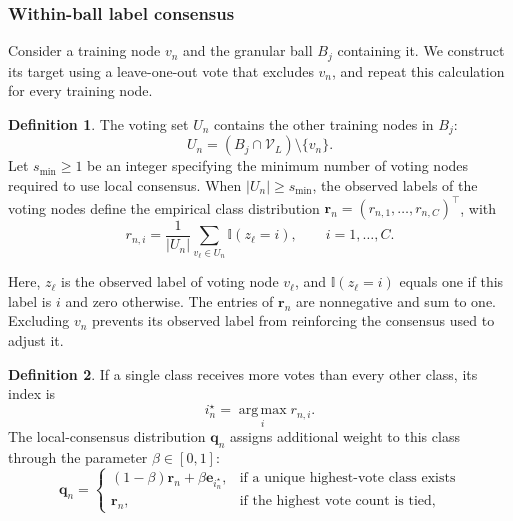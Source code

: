 \documentclass[times,review,10pt]{elsarticle}
\theoremstyle{definition}
\newtheorem{definition}{Definition}
\theoremstyle{plain}
\begin{document}
\subsubsection{Within-ball label consensus}\label{sec:3.3.1}

Consider a training node \(v_n\) and the granular ball \(B_j\) containing it. We construct its target using a leave-one-out vote that excludes \(v_n\), and repeat this calculation for every training node.

\begin{definition}
The voting set \(U_n\) contains the other training nodes in \(B_j\):
\begin{equation}\label{eq:7}
U_n=(B_j\cap\mathcal V_L)\setminus\{v_n\}.
\end{equation}
Let \(s_{\min}\geq1\) be an integer specifying the minimum number of voting nodes required to use local consensus. When \(|U_n|\geq s_{\min}\), the observed labels of the voting nodes define the empirical class distribution \(\mathbf r_n=(r_{n,1},\ldots,r_{n,C})^\top\), with
\begin{equation}\label{eq:8}
r_{n,i}=\frac{1}{|U_n|}\sum_{v_\ell\in U_n}\mathbb I(z_\ell=i),
\qquad i=1,\ldots,C.
\end{equation}
\end{definition}

Here, \(z_\ell\) is the observed label of voting node \(v_\ell\), and \(\mathbb I(z_\ell=i)\) equals one if this label is \(i\) and zero otherwise. The entries of \(\mathbf r_n\) are nonnegative and sum to one. Excluding \(v_n\) prevents its observed label from reinforcing the consensus used to adjust it.

\begin{definition}
If a single class receives more votes than every other class, its index is
\begin{equation}\label{eq:9}
i_n^\star=\operatorname*{arg\,max}_i r_{n,i}.
\end{equation}
The local-consensus distribution \(\mathbf q_n\) assigns additional weight to this class through the parameter \(\beta\in[0,1]\):
\begin{equation}\label{eq:10}
\mathbf q_n=
\begin{cases}
(1-\beta)\mathbf r_n+\beta\mathbf e_{i_n^\star},&\text{if a unique highest-vote class exists}\\
\mathbf r_n,&\text{if the highest vote count is tied},
\end{cases}
\end{equation}
\end{definition}
\end{document}
